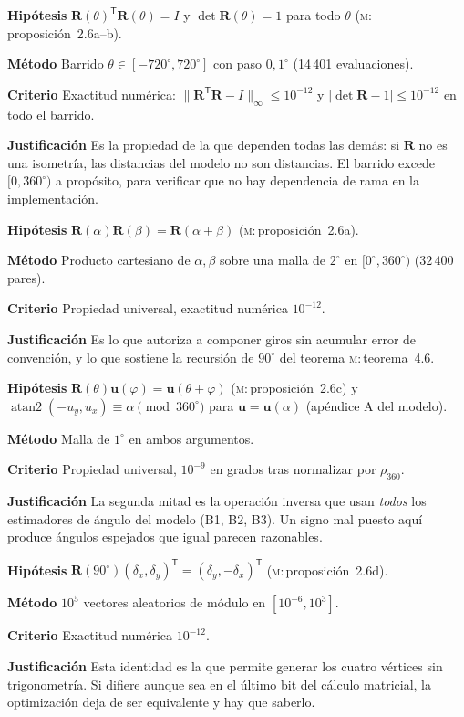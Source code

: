 \documentclass[11pt,a4paper]{article}
\newcommand{\Rot}{\mathbf{R}}
\newcommand{\uu}{\mathbf{u}}
\newcommand{\atantwo}{\operatorname{atan2}}
\newcommand{\grados}{^{\circ}}
\newenvironment{prueba}[2]{%
  \par\medskip\noindent
  \begin{tcolorbox}[enhanced,breakable,colback=white,colframe=black!45,
    boxrule=0.5pt,arc=1pt,left=6pt,right=6pt,top=4pt,bottom=4pt,
    title={\bfseries #1\quad\normalfont #2},
    colbacktitle=black!8,coltitle=black,fonttitle=\bfseries\small]
  \small
}{\end{tcolorbox}\par\medskip}
\newcommand{\campo}[1]{\par\smallskip\noindent\textbf{#1}\quad\ignorespaces}
\begin{document}
\begin{prueba}{N0.1}{Ortogonalidad del operador de rotación}
\campo{Hipótesis} $\Rot(\theta)^{\mathsf T}\Rot(\theta) = I$ y $\det\Rot(\theta)=1$
para todo $\theta$ (\textsc{m}:\,proposición~2.6a--b).
\campo{Método} Barrido $\theta \in [-720\grados, 720\grados]$ con paso $0{,}1\grados$
(14\,401 evaluaciones).
\campo{Criterio} Exactitud numérica: $\|\Rot^{\mathsf T}\Rot - I\|_\infty \le 10^{-12}$
y $|\det\Rot - 1| \le 10^{-12}$ en todo el barrido.
\campo{Justificación} Es la propiedad de la que dependen todas las demás: si $\Rot$ no
es una isometría, las distancias del modelo no son distancias. El barrido excede
$[0,360\grados)$ a propósito, para verificar que no hay dependencia de rama en la
implementación.
\end{prueba}

\begin{prueba}{N0.2}{Homomorfismo de rotaciones}
\campo{Hipótesis} $\Rot(\alpha)\Rot(\beta) = \Rot(\alpha+\beta)$ (\textsc{m}:\,proposición~2.6a).
\campo{Método} Producto cartesiano de $\alpha,\beta$ sobre una malla de $2\grados$ en
$[0\grados,360\grados)$ ($32\,400$ pares).
\campo{Criterio} Propiedad universal, exactitud numérica $10^{-12}$.
\campo{Justificación} Es lo que autoriza a componer giros sin acumular error de
convención, y lo que sostiene la recursión de $90\grados$ del teorema \textsc{m}:\,teorema~4.6.
\end{prueba}

\begin{prueba}{N0.3}{Acción sobre versores y recuperación del argumento}
\campo{Hipótesis} $\Rot(\theta)\uu(\varphi) = \uu(\theta+\varphi)$ (\textsc{m}:\,proposición~2.6c) y
$\atantwo(-u_y, u_x) \equiv \alpha \pmod{360\grados}$ para $\uu = \uu(\alpha)$
(apéndice A del modelo).
\campo{Método} Malla de $1\grados$ en ambos argumentos.
\campo{Criterio} Propiedad universal, $10^{-9}$ en grados tras normalizar por
$\rho_{360}$.
\campo{Justificación} La segunda mitad es la operación inversa que usan \emph{todos}
los estimadores de ángulo del modelo (B1, B2, B3). Un signo mal puesto aquí produce
ángulos espejados que igual parecen razonables.
\end{prueba}

\begin{prueba}{N0.4}{Forma cerrada de la rotación de $90\grados$}
\campo{Hipótesis} $\Rot(90\grados)(\delta_x,\delta_y)^{\mathsf T} =
(\delta_y, -\delta_x)^{\mathsf T}$ (\textsc{m}:\,proposición~2.6d).
\campo{Método} $10^5$ vectores aleatorios de módulo en $[10^{-6}, 10^{3}]$.
\campo{Criterio} Exactitud numérica $10^{-12}$.
\campo{Justificación} Esta identidad es la que permite generar los cuatro vértices sin
trigonometría. Si difiere aunque sea en el último bit del cálculo matricial, la
optimización deja de ser equivalente y hay que saberlo.
\end{prueba}
\end{document}
